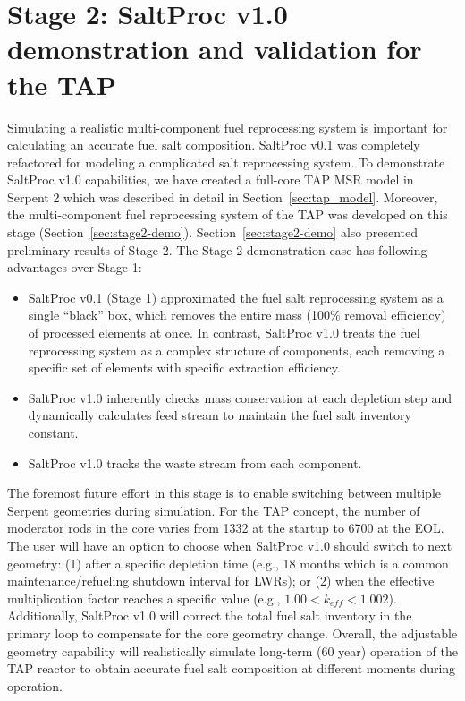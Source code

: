 \section{Stage 2: SaltProc v1.0 demonstration and validation for the TAP}
Simulating a realistic multi-component fuel reprocessing system is important 
for calculating an accurate fuel salt composition. SaltProc v0.1 was 
completely refactored for modeling a complicated salt reprocessing system. To 
demonstrate SaltProc v1.0 capabilities, we have created a full-core \gls{TAP} 
\gls{MSR} model in Serpent 2 \cite{chaube_tap_2019} which was described in 
detail in Section~\ref{sec:tap_model}. Moreover, the multi-component fuel 
reprocessing system of the \gls{TAP} was developed on this stage 
(Section~\ref{sec:stage2-demo}). Section~\ref{sec:stage2-demo} also presented 
preliminary results of Stage 2. The Stage 2 demonstration case has following 
advantages over Stage 1:
\begin{itemize}
	\item SaltProc v0.1 (Stage 1) approximated the fuel salt reprocessing 
	system 
	as a single ``black'' box, which removes the entire mass (100\% removal 
	efficiency) of processed elements at once. In contrast, SaltProc v1.0 
	treats the fuel reprocessing system as a complex structure of components, 
	each removing a specific set of elements with specific extraction 
	efficiency. 
	\item SaltProc v1.0 inherently checks mass conservation at each depletion 
	step and dynamically calculates feed stream to maintain the fuel salt 
	inventory constant.
	\item SaltProc v1.0 tracks the waste stream from each component.
\end{itemize}

The foremost future effort in this stage is to enable switching between 
multiple Serpent geometries during simulation. For the \gls{TAP} concept, the 
number of moderator rods in the core varies from 1332 at the startup to 6700 
at the \gls{EOL}. The user will have an option to choose when SaltProc v1.0 
should switch to next geometry: (1) after a specific depletion  time (e.g., 18 
months which is a common maintenance/refueling shutdown interval for 
\glspl{LWR}); or (2) when the effective multiplication factor reaches a 
specific value (e.g., $1.00<k_{eff} < 1.002$). Additionally, SaltProc v1.0 
will correct the total fuel salt inventory in the primary loop to compensate 
for the core geometry change. Overall, the adjustable geometry capability will 
realistically simulate long-term (60 year) operation of the \gls{TAP} reactor 
to obtain accurate fuel salt composition at different moments during operation.

